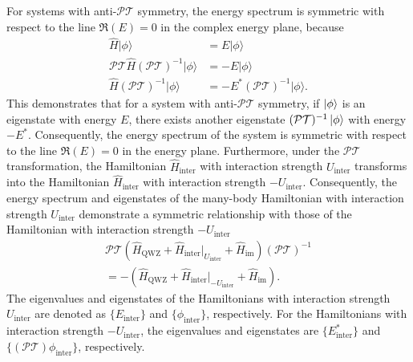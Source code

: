 \documentclass[longbibliography, aps, prx, amsmath, amssymb, amsfonts, twocolumn,superscriptaddress, footinbib]{revtex4-1}
\begin{document}
	For systems with anti-$\mathcal{PT}$ symmetry, the energy spectrum is symmetric with respect to the line $\Re(E)=0$ in the complex energy plane, because
	\begin{equation}
		\begin{split}
			\hat{H} \vert \phi \rangle &= E \vert \phi \rangle\\
			\mathcal{PT} \hat{H} (\mathcal{PT})^{-1} \vert \phi \rangle &= - E \vert \phi \rangle\\
			\hat{H} (\mathcal{PT})^{-1} \vert \phi \rangle &= - E^* (\mathcal{PT})^{-1} \vert \phi \rangle.
		\end{split}
	\end{equation}
	This demonstrates that for a system with anti-$\mathcal{PT}$ symmetry, if $\ket{\phi}$ is an eigenstate with energy $E$, there exists another eigenstate $(\mathcal{PT})^{-1} \ket{\phi}$ with energy $-E^*$. Consequently, the energy spectrum of the system is symmetric with respect to the line $\Re(E)=0$ in the energy plane.
	Furthermore, under the $\mathcal{PT}$ transformation, the Hamiltonian $\hat{H}_{\text{inter}}$ with interaction strength $U_{\text{inter}}$ transforms into the Hamiltonian $\hat{H}_{\text{inter}}$ with interaction strength $-U_{\text{inter}}$. Consequently, the energy spectrum and eigenstates of the many-body Hamiltonian with interaction strength $U_{\text{inter}}$ demonstrate a symmetric relationship with those of the Hamiltonian with interaction strength $-U_{\text{inter}}$
	\begin{equation}
		\begin{split}
			\mathcal{PT} (\hat{H}_{\text{QWZ}}+\hat{H}_{\text{inter}}\vert_{U_{\text{inter}}}+\hat{H}_{\text{im}}) (\mathcal{PT})^{-1}\\
			= -(\hat{H}_{\text{QWZ}}+\hat{H}_{\text{inter}}\vert_{-U_{\text{inter}}}+\hat{H}_{\text{im}}).
		\end{split}
	\end{equation}
	The eigenvalues and eigenstates of the Hamiltonians with interaction strength $U_{\text{inter}}$ are denoted as $\{E_{\text{inter}}\}$ and $\{\phi_{\text{inter}}\}$, respectively. For the Hamiltonians with interaction strength $-U_{\text{inter}}$, the eigenvalues and eigenstates are $\{E_{\text{inter}}^*\}$ and $\{(\mathcal{PT})\phi_{\text{inter}}\}$, respectively.

	
\end{document}
